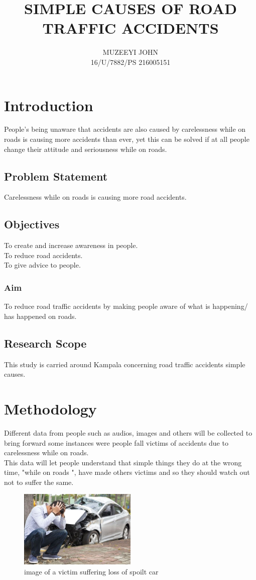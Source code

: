 \documentclass[12pt]{article}
\begin{document}
\title{SIMPLE CAUSES OF ROAD TRAFFIC ACCIDENTS}
\author{MUZEEYI JOHN \\ 16/U/7882/PS 216005151}
\maketitle
\section{Introduction}
People's being unaware that accidents are also caused by carelessness while on roads is causing more accidents than ever, yet this can be solved if at all people change their attitude and seriousness while on roads. 
\subsection{Problem Statement }
Carelessness while on roads is causing more road accidents.
\subsection{Objectives}
To create and increase awareness in people.
\\ To reduce road accidents.
\\ To give advice to people.

\subsubsection{Aim  }
To reduce road traffic accidents by making people aware of what is happening/ has happened on roads.
\subsection{Research Scope }
This study is carried around Kampala concerning road traffic accidents simple causes.
\section{Methodology}
Different data from people such as audios, images and others will be collected to bring forward some instances were people fall victims of accidents due to carelessness while on roads.
\\ This data will let people understand that simple things they do at the wrong time, "while on roads ", have made others victims and so they should watch out not to suffer the same. 
\begin{figure}[h!] \centering \includegraphics[width=0.5\textwidth]{capture} 
\caption{image of a victim suffering loss of spoilt car}
 \end{figure}
\end{document}
